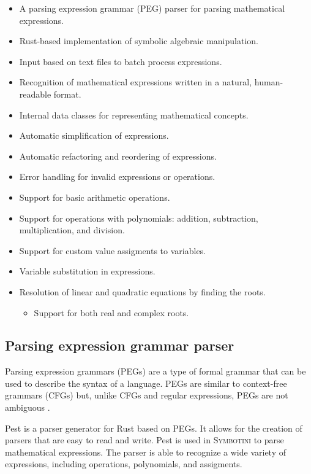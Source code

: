 \begin{itemize}
    \item A parsing expression grammar (PEG) parser for parsing mathematical expressions.
    \item Rust-based implementation of symbolic algebraic manipulation.
    \item Input based on text files to batch process expressions.
    \item Recognition of mathematical expressions written in a natural, human-readable format.
    \item Internal data classes for representing mathematical concepts.
    \item Automatic simplification of expressions.
    \item Automatic refactoring and reordering of expressions.
    \item Error handling for invalid expressions or operations.
    \item Support for basic arithmetic operations.
    \item Support for operations with polynomials: addition, subtraction, multiplication, and division.
    \item Support for custom value assigments to variables.
    \item Variable substitution in expressions.
    \item Resolution of linear and quadratic equations by finding the roots.
        \begin{itemize}
            \item Support for both real and complex roots.
        \end{itemize}
\end{itemize}

\subsection{Parsing expression grammar parser}\label{subsec:peg-parser}

Parsing expression grammars (PEGs) are a type of formal grammar that can be used to describe the syntax of a language. PEGs are similar to context-free grammars (CFGs) but, unlike CFGs and regular expressions, PEGs are not ambiguous \parencite{pest-book,ford2004parsing}.

Pest \parencite{pest-book} is a parser generator for Rust based on PEGs. It allows for the creation of parsers that are easy to read and write. Pest is used in \textsc{Symbotini} to parse mathematical expressions. The parser is able to recognize a wide variety of expressions, including operations, polynomials, and assigments.

